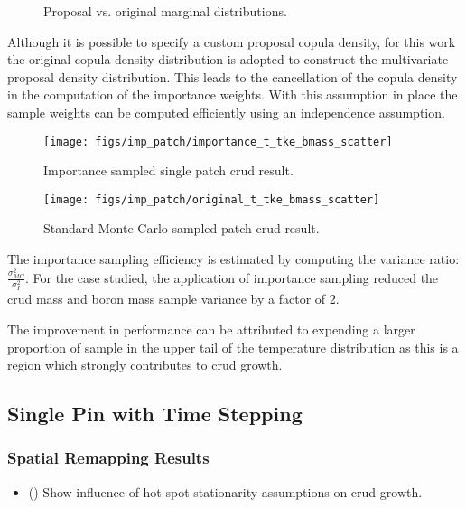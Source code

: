 \begin{figure}[H]%
    \centering
    \qquad
    \caption[]{Proposal vs. original marginal distributions.}%
    \label{fig:imp_sample2}%
\end{figure}

Although it is possible to specify a custom proposal copula density, for this work the original copula density distribution is adopted to construct the multivariate proposal density distribution.  This leads to the cancellation of the copula density in the computation of the importance weights.  With this assumption in place the sample weights can be computed efficiently using an independence assumption.

\begin{figure}[H]
    \centering
    \texttt{[image: figs/imp\_patch/importance\_t\_tke\_bmass\_scatter]}
    \caption[Importance sampled single patch crud result.]{Importance sampled single patch crud result.}
    \label{fig:importancettkebmassscatter}
\end{figure}

\begin{figure}[H]
    \centering
    \texttt{[image: figs/imp\_patch/original\_t\_tke\_bmass\_scatter]}
    \caption[Standard Monte Carlo sampled patch crud result.]{Standard Monte Carlo sampled patch crud result.}
    \label{fig:originalttkebmassscatter}
\end{figure}

The importance sampling efficiency is estimated by computing the variance ratio:  $\frac{\sigma^2_{MC}}{\sigma^2_{I}}$.  For the case studied, the application of importance sampling reduced the crud mass and boron mass sample variance by a factor of 2.

The improvement in performance can be attributed to expending a larger proportion of sample in the upper tail of the temperature distribution as this is a region which strongly contributes to crud growth.


\subsection{Single Pin with Time Stepping}

\subsubsection{Spatial Remapping Results}
\begin{itemize}
	\item (\checkmark) Show influence of hot spot stationarity assumptions on crud growth.
\end{itemize}

